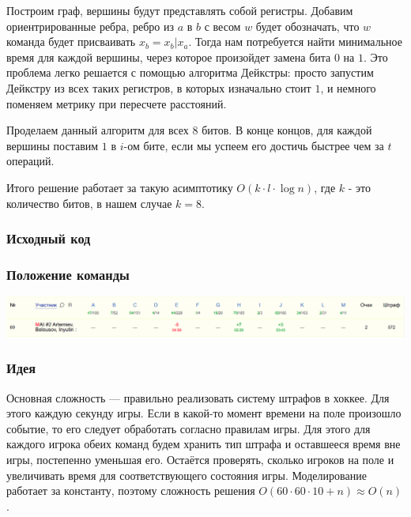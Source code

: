 \documentclass[12pt]{article}
\begin{document}
Построим граф, вершины будут представлять собой регистры. Добавим ориентрированные ребра, ребро из $a$ в $b$ с весом $w$ будет обозначать, что $w$ команда будет присваивать $x_b = x_b | x_a$. Тогда нам потребуется найти минимальное время для каждой вершины, через которое произойдет замена бита $0$ на $1$. Это проблема легко решается с помощью алгоритма Дейкстры: просто запустим Дейкстру из всех таких регистров, в которых изначально стоит $1$, и немного поменяем метрику при пересчете расстояний.

Проделаем данный алгоритм для всех $8$ битов. В конце концов, для каждой вершины поставим $1$ в $i$-ом бите, если мы успеем его достичь быстрее чем за $t$ операций.

Итого решение работает за такую асимптотику $O(k \cdot l \cdot \log{n})$, где $k$ - это количество битов, в нашем случае $k = 8$.

\subsubsection*{Исходный код}

\subsubsection*{Положение команды}
\includegraphics[scale=0.25]{images/gp_korea.png}\newline\noindent
\pagebreak


\subsubsection*{Идея}
Основная сложность --- правильно реализовать систему штрафов в хоккее. Для этого каждую секунду игры. Если в какой-то момент времени на поле произошло событие, то его следует обработать согласно правилам игры. Для этого для каждого игрока обеих команд будем хранить тип штрафа и оставшееся время вне игры, постепенно уменьшая его. Остаётся проверять, сколько игроков на поле и увеличивать время для соответствующего состояния игры. Моделирование работает за константу, поэтому сложность решения $O(60 \cdot 60 \cdot 10 + n) \approx O(n)$.
\end{document}
